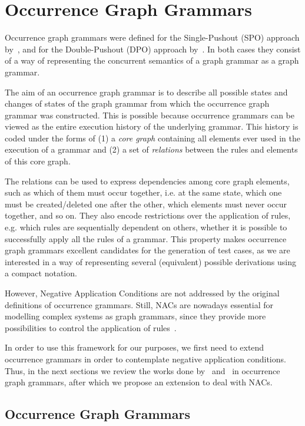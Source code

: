\chapter{Occurrence Graph Grammars}\label{ch:process}

Occurrence graph grammars were defined for the Single-Pushout (SPO) approach by~\cite{Ribeiro1996}, and for the Double-Pushout (DPO) approach by~\cite{Corradini1996}. In both cases they consist of a way of representing the concurrent semantics of a graph grammar as a graph grammar. 

The aim of an occurrence graph grammar is to describe all possible states and changes of states of the graph grammar from which the occurrence graph grammar was constructed. This is possible because occurrence grammars can be viewed as the entire execution history of the underlying grammar. This history is coded under the forms of (1) a \emph{core graph} containing all elements ever used in the execution of a grammar and (2) a set of \emph{relations} between the rules and elements of this core graph. 

The relations can be used to express dependencies among core graph elements, such as which of them must occur together, i.e. at the same state, which one must be created/deleted one after the other, which elements must never occur together, and so on. They also encode restrictions over the application of rules, e.g. which rules are sequentially dependent on others, whether it is possible to successfully apply all the rules of a grammar. This property makes occurrence graph grammars excellent
candidates for the generation of test cases, as we are interested in a way of representing several (equivalent) possible derivations using a compact notation.

However, Negative Application Conditions are not addressed by the original definitions of occurrence grammars. Still, NACs are nowadays essential for modelling complex systems as graph grammars, since they provide more possibilities to control the application of rules~\cite{Habel1996, Lambers2008, Corradini2014}.

In order to use this framework for our purposes, we first need to extend occurrence grammars in order to contemplate negative application conditions. Thus, in the next sections we review the works done by~\cite{Ribeiro1996} and~\cite{Corradini1996} in occurrence graph grammars, after which we propose an extension to deal with NACs.

\section{Occurrence Graph Grammars}


